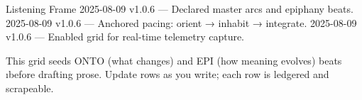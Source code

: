 

\begin{SectionHeaderLedger}{Listening Frame}
        2025-08-09 v1.0.6 — Declared master arcs and epiphany beats.
      2025-08-09 v1.0.6 — Anchored pacing: orient → inhabit → integrate.
     2025-08-09 v1.0.6 — Enabled grid for real-time telemetry capture.
\end{SectionHeaderLedger}

This grid seeds ONTO (what changes) and EPI (how meaning evolves) beats \i{before} drafting prose. 
Update rows as you write; each row is ledgered and scrapeable.

\newcommand{\Beat}[1]{\textsc{#1}}
\newcommand{\Arc}[1]{\textbf{#1}}
\newcommand{\SecRef}[1]{\S\,#1}

